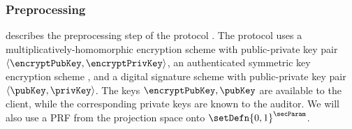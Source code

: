\subsubsection{Preprocessing}
%
 describes the preprocessing step of the protocol \protocolFMP. The protocol 
uses a multiplicatively-homomorphic encryption scheme \pkencryptionSchemeDefn with public-private key pair $\langle \encryptPubKey, \encryptPrivKey \rangle$, 
an authenticated symmetric key encryption scheme \encryptionSchemeDefn, and a digital signature scheme \sigSchemeDefn with public-private key pair $\langle \pubKey, \privKey \rangle$. The keys $\encryptPubKey, \pubKey$ are available to the client, while the corresponding private keys are known to the auditor. We will also use a PRF \prf from the projection space onto $\setDefn{0,1}^{\secParam}$. 

